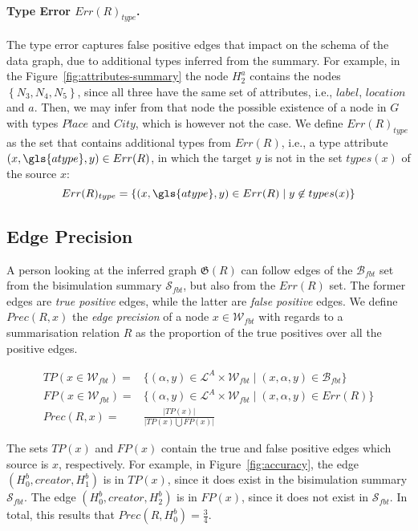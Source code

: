 \paragraph{Type Error $Err(R)_{type}$.}

The type error captures false positive edges that impact on the schema of the data graph, due to additional types inferred from the summary.
For example, in the Figure~\ref{fig:attributes-summary} the node $H^a_2$ contains the nodes $\left\lbrace N_3, N_4, N_5 \right\rbrace$, since all three have the same set of attributes, i.e., $label$, $location$ and $a$. Then, we may infer from that node the possible existence of a node in $G$ with types $Place$ and $City$, which is however not the case. We define $Err(R)_{type}$ as the set that contains additional types from $Err(R)$, i.e., a type attribute $(x, \gls{atype}, y) \in Err(R)$, in which the target $y$ is not in the set $types(x)$ of the source $x$:
$$
Err(R)_{type} = \left\lbrace (x, \gls{atype}, y) \in Err(R) \mid y \not \in types(x) \right\rbrace
$$

\subsection{Edge Precision}
\label{sec:edge-precision}

A person looking at the inferred graph $\mathfrak{G}(R)$ can follow edges of the $\mathcal{B}_{fbt}$ set from the bisimulation summary $\mathcal{S}_{fbt}$, but also from the $Err(R)$ set. The former edges are \emph{true positive} edges, while the latter are \emph{false positive} edges. We define $Prec(R, x)$ the \emph{edge precision} of a node $x \in \mathcal{W}_{fbt}$ with regards to a summarisation relation $R$ as the proportion of the true positives over all the positive edges.

$$
\begin{aligned}
TP(x \in \mathcal{W}_{fbt}) = & \{ (\alpha, y) \in \mathcal{L}^A \times \mathcal{W}_{fbt} \mid (x, \alpha, y) \in \mathcal{B}_{fbt} \} \\
FP(x \in \mathcal{W}_{fbt}) = & \{ (\alpha, y) \in \mathcal{L}^A \times \mathcal{W}_{fbt} \mid (x, \alpha, y) \in Err(R) \} \\
Prec(R, x) = & \frac{\vert TP(x) \vert}{\vert TP(x) \bigcup FP(x) \vert}
\end{aligned}
$$

The sets $TP(x)$ and $FP(x)$ contain the true and false positive edges which source is $x$, respectively. For example, in Figure~\ref{fig:accuracy}, the edge $(H^b_0, creator, H^b_1)$ is in $TP(x)$, since it does exist in the bisimulation summary $\mathcal{S}_{fbt}$. The edge $(H^b_0, creator, H^b_2)$ is in $FP(x)$, since it does not exist in $\mathcal{S}_{fbt}$. In total, this results that $Prec\left(R, H^b_0\right) = \frac{3}{4}$.

